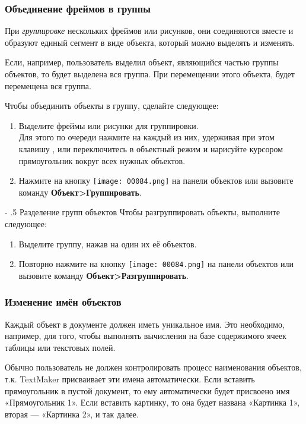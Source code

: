 ﻿\documentclass[a4paper,10pt]{article}
\makeatletter
\renewcommand\paragraph{%
   \@startsection{paragraph}{4}{0mm}%
      {-\baselineskip}%
      {.5\baselineskip}%
      {\normalfont\normalsize\bfseries}}
\makeatother
\begin{document}
\subsubsection{Объединение фреймов в группы}
При \textit{группировке} нескольких фреймов или рисунков, они соединяются вместе и образуют единый сегмент в виде объекта, который можно выделять и изменять.

Если, например, пользователь выделил объект, являющийся частью группы объектов, то будет выделена вся группа. При перемещении этого объекта, будет перемещена вся группа.

Чтобы объединить объекты в группу, сделайте следующее:

\begin{enumerate}
 \item Выделите фреймы или рисунки для группировки.\\
 Для этого по очереди нажмите на каждый из них, удерживая при этом клавишу , или переключитесь в объектный режим и нарисуйте курсором прямоугольник вокруг всех нужных объектов.
 \item Нажмите на кнопку \texttt{[image: 00084.png]} на панели объектов или вызовите команду \textbf{Объект>Группировать}.
\end{enumerate}

\paragraph{Разделение групп объектов}
Чтобы разгруппировать объекты, выполните следующее:
\begin{enumerate}
 \item Выделите группу, нажав на один их её объектов.
 \item Повторно нажмите на кнопку \texttt{[image: 00084.png]} на панели объектов или вызовите команду \textbf{Объект>Разгруппировать}.
\end{enumerate}

\subsubsection{Изменение имён объектов}
Каждый объект в документе должен иметь уникальное имя. Это необходимо, например, для того, чтобы выполнять вычисления на базе содержимого ячеек таблицы или текстовых полей.

Обычно пользователь не должен контролировать процесс наименования объектов, т.к. TextMaker присваивает эти имена автоматически. Если вставить прямоугольник в пустой документ, то ему автоматически будет присвоено имя «Прямоугольник 1». Если вставить картинку, то она будет названа «Картинка 1», вторая — «Картинка 2», и так далее.
\end{document}
